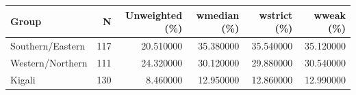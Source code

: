 \begin{tabular}{lrrrrr}
\toprule
Group & N & Unweighted (\%) & wmedian (\%) & wstrict (\%) & wweak (\%) \\
\midrule
Southern/Eastern & 117 & 20.510000 & 35.380000 & 35.540000 & 35.120000 \\
Western/Northern & 111 & 24.320000 & 30.120000 & 29.880000 & 30.540000 \\
Kigali & 130 & 8.460000 & 12.950000 & 12.860000 & 12.990000 \\
\bottomrule
\end{tabular}
